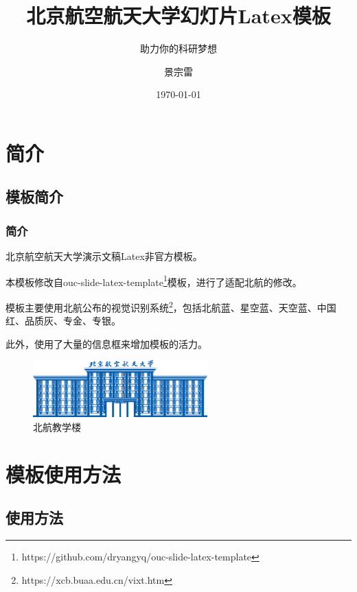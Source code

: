\documentclass[aspectratio=169,UTF8,t]{beamer}%
\title{北京航空航天大学幻灯片Latex模板}
\subtitle{助力你的科研梦想}
\author{景宗雷}
\date{\today}
\institute{计算机学院}
\begin{document}
\maketitle

\makeoutline

\section{简介}

\subsection{模板简介}

\begin{frame}
    \frametitle{简介}
    北京航空航天大学演示文稿Latex非官方模板。

    本模板修改自ouc-slide-latex-template\footnote{https://github.com/dryangyq/ouc-slide-latex-template}模板，进行了适配北航的修改。

    模板主要使用北航公布的视觉识别系统\footnote{https://xcb.buaa.edu.cn/vixt.htm}，包括北航蓝、星空蓝、天空蓝、中国红、品质灰、专金、专银。

    此外，使用了大量的信息框来增加模板的活力。
    \begin{center}
        \begin{figure}
        \centering
        \includegraphics[width=0.6\textwidth]{figs/buaa_main.png}
            \caption{北航教学楼}
            \label{fig:main}
        \end{figure}
    \end{center}
    
    
\end{frame}

\section{模板使用方法}

\subsection{使用方法}
\end{document}
